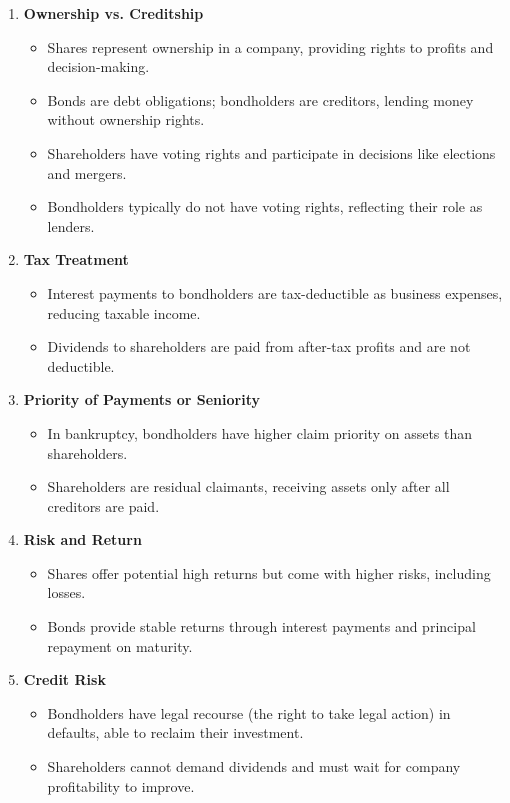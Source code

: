\begin{enumerate}
    \item \textbf{Ownership vs. Creditship}
    \begin{itemize}
        \item Shares represent ownership in a company, providing rights to profits and decision-making.
        \item Bonds are debt obligations; bondholders are creditors, lending money without ownership rights.
        \item Shareholders have voting rights and participate in decisions like elections and mergers.
        \item Bondholders typically do not have voting rights, reflecting their role as lenders.
    \end{itemize}

    \item \textbf{Tax Treatment}
    \begin{itemize}
        \item Interest payments to bondholders are tax-deductible as business expenses, reducing taxable income.
        \item Dividends to shareholders are paid from after-tax profits and are not deductible.
    \end{itemize}

    \item \textbf{Priority of Payments or Seniority}
    \begin{itemize}
        \item In bankruptcy, bondholders have higher claim priority on assets than shareholders.
        \item Shareholders are residual claimants, receiving assets only after all creditors are paid.
    \end{itemize}

    \item \textbf{Risk and Return}
    \begin{itemize}
        \item Shares offer potential high returns but come with higher risks, including losses.
        \item Bonds provide stable returns through interest payments and principal repayment on maturity.
    \end{itemize}

    \item \textbf{Credit Risk}
    \begin{itemize}
        \item Bondholders have legal recourse (the right to take legal action) in defaults, able to reclaim their investment.
        \item Shareholders cannot demand dividends and must wait for company profitability to improve.
    \end{itemize}
\end{enumerate}


